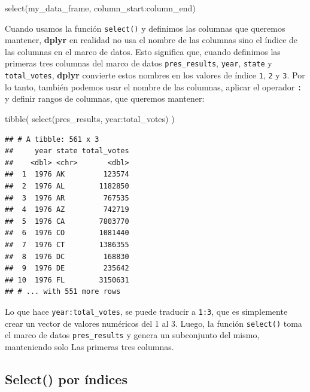 \documentclass[
]{book}
\newenvironment{Shaded}{\begin{snugshade}}{\end{snugshade}}
\newcommand{\FunctionTok}[1]{\textcolor[rgb]{0.00,0.00,0.00}{#1}}
\newcommand{\NormalTok}[1]{#1}
\newcommand{\SpecialCharTok}[1]{\textcolor[rgb]{0.00,0.00,0.00}{#1}}
\begin{document}
\begin{Shaded}
\begin{Highlighting}[]
\FunctionTok{select}\NormalTok{(my\_data\_frame, column\_start}\SpecialCharTok{:}\NormalTok{column\_end)}
\end{Highlighting}
\end{Shaded}

Cuando usamos la función \texttt{select()} y definimos las columnas que queremos mantener, \textbf{dplyr} en realidad no usa el nombre de las columnas sino el índice de las columnas en el marco de datos. Esto significa que, cuando definimos las primeras tres columnas del marco de datos \texttt{pres\_results}, \texttt{year}, \texttt{state} y \texttt{total\_votes}, \textbf{dplyr} convierte estos nombres en los valores de índice \texttt{1}, \texttt{2} y \texttt{3}. Por lo tanto, también podemos usar el nombre de las columnas, aplicar el operador \texttt{:} y definir rangos de columnas, que queremos mantener:

\begin{Shaded}
\begin{Highlighting}[]
\FunctionTok{tibble}\NormalTok{(}
\FunctionTok{select}\NormalTok{(pres\_results, year}\SpecialCharTok{:}\NormalTok{total\_votes)}
\NormalTok{)}
\end{Highlighting}
\end{Shaded}

\begin{verbatim}
## # A tibble: 561 x 3
##     year state total_votes
##    <dbl> <chr>       <dbl>
##  1  1976 AK         123574
##  2  1976 AL        1182850
##  3  1976 AR         767535
##  4  1976 AZ         742719
##  5  1976 CA        7803770
##  6  1976 CO        1081440
##  7  1976 CT        1386355
##  8  1976 DC         168830
##  9  1976 DE         235642
## 10  1976 FL        3150631
## # ... with 551 more rows
\end{verbatim}

Lo que hace \texttt{year:total\_votes}, se puede traducir a \texttt{1:3}, que es simplemente crear un vector de valores numéricos del 1 al 3. Luego, la función \texttt{select()} toma el marco de datos \texttt{pres\_results} y genera un subconjunto del mismo, manteniendo solo Las primeras tres columnas.

\hypertarget{select-por-uxedndices}{%
\subsection{Select() por índices}\label{select-por-uxedndices}}
\end{document}
